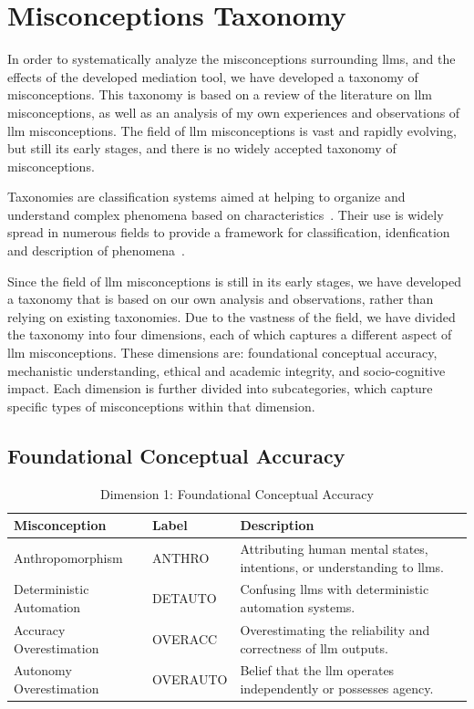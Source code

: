 \chapter{Misconceptions Taxonomy}\label{taxonomy}
In order to systematically analyze the misconceptions surrounding \gls{llms}, and the effects of the developed mediation tool, we have developed a taxonomy of misconceptions. This taxonomy is based on a review of the literature on \gls{llm} misconceptions, as well as an analysis of my own experiences and observations of \gls{llm} misconceptions. The field of \gls{llm} misconceptions is vast and rapidly evolving, but still its early stages, and there is no widely accepted taxonomy of misconceptions.

Taxonomies are classification systems aimed at helping to organize and understand complex phenomena based on characteristics\ \cite{kundisch_update_2022}. Their use is widely spread in numerous fields to provide a framework for classification, idenfication and description of phenomena\ \cite{schoormann_exploring_2022}.

Since the field of \gls{llm} misconceptions is still in its early stages, we have developed a taxonomy that is based on our own analysis and observations, rather than relying on existing taxonomies. Due to the vastness of the field, we have divided the taxonomy into four dimensions, each of which captures a different aspect of \gls{llm} misconceptions. These dimensions are: foundational conceptual accuracy, mechanistic understanding, ethical and academic integrity, and socio-cognitive impact. Each dimension is further divided into subcategories, which capture specific types of misconceptions within that dimension.


\section{Foundational Conceptual Accuracy}
\begin{table}
\centering
\caption{Dimension 1: Foundational Conceptual Accuracy}\label{dim1}
\begin{tabularx}{\textwidth}{|l|l|X|}
\hline
\textbf{Misconception} & \textbf{Label} & \textbf{Description} \\
\hline
Anthropomorphism & ANTHRO & Attributing human mental states, intentions, or understanding to \gls{llms}. \\
\hline
Deterministic Automation & DETAUTO & Confusing \gls{llms} with deterministic automation systems. \\
\hline
Accuracy Overestimation & OVERACC & Overestimating the reliability and correctness of \gls{llm} outputs. \\
\hline
Autonomy Overestimation & OVERAUTO & Belief that the \gls{llm} operates independently or possesses agency. \\
\hline
\end{tabularx}
\end{table}

